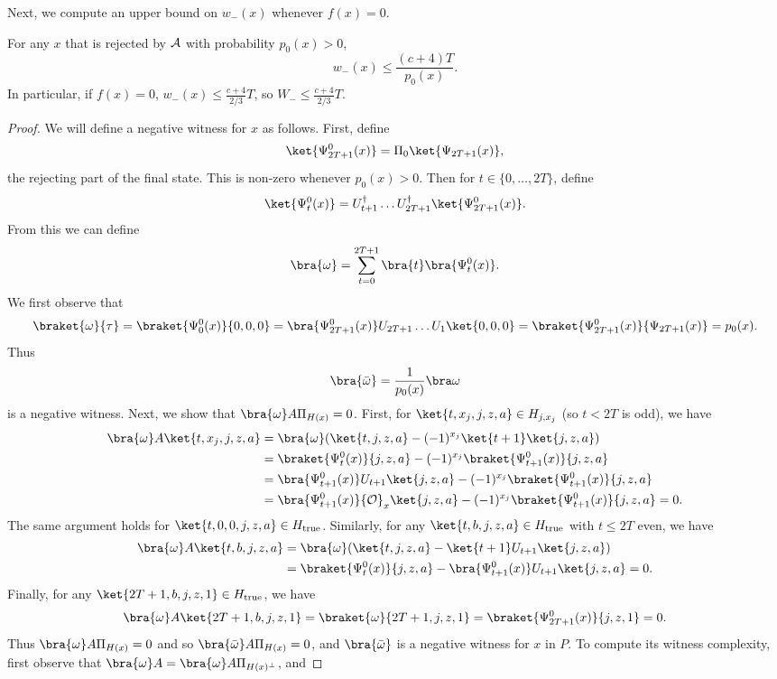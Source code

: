 \documentclass{toc}
\begin{document}
Next, we %
compute an upper bound on  %
$w_-(x)$ whenever $f(x)=0$. %
\begin{lemma}\label{lem:alg-to-span-neg}
For any $x$ that is rejected by $\cal A$ with probability $p_0(x)>0$, 
$$w_-(x)\leq \frac{(c+4)T}{p_0(x)}.$$
In particular, if $f(x)=0$, $w_-(x)\leq \frac{c+4}{2/3}T$, so $W_-\leq \frac{c+4}{2/3}T$.
\end{lemma}
\begin{proof}
We will define a negative witness for $x$ as follows. First, define 
$$\ket{\Psi_{2T+1}^0(x)}=\Pi_0\ket{\Psi_{2T+1}(x)},$$
the rejecting part of the final state. This is non-zero whenever $p_0(x)>0$. Then for $t\in\{0,\dots,2T\}$, define
$$\ket{\Psi_t^0(x)}=U_{t+1}^\dagger\dots U_{2T+1}^\dagger \ket{\Psi_{2T+1}^0(x)}.$$
From this we can define 
$$\bra{\omega} = \sum_{t=0}^{2T+1}\bra{t}\bra{\Psi_t^0(x)}.$$
We first observe that
$$\braket{\omega}{\tau} = \braket{\Psi_0^0(x)}{0,0,0}=\bra{\Psi_{2T+1}^0(x)}U_{2T+1}\dots U_1\ket{0,0,0}=\braket{\Psi_{2T+1}^0(x)}{\Psi_{2T+1}(x)} 
=p_0(x).$$
Thus 
$$\bra{\bar\omega}=\frac{1}{p_0(x)}\bra\omega$$
is a negative witness. Next, we show that $\bra{{\omega}} A\Pi_{H(x)}=0$. First, for $\ket{t,x_j,j,z,a}\in H_{j,x_j}$ (so $t<2T$ is odd), we have
\begin{align*}
\bra{\omega}A\ket{t,x_j,j,z,a} &= \bra{\omega}(\ket{t,j,z,a}-(-1)^{x_j}\ket{t+1}\ket{j,z,a})\\
&= \braket{\Psi_t^0(x)}{j,z,a} - (-1)^{x_j}\braket{\Psi_{t+1}^0(x)}{j,z,a}\\
&= \bra{\Psi_{t+1}^0(x)}U_{t+1}\ket{j,z,a} - (-1)^{x_j}\braket{\Psi_{t+1}^0(x)}{j,z,a}\\
&= \bra{\Psi_{t+1}^0(x)}{\cal O}_x\ket{j,z,a} - (-1)^{x_j}\braket{\Psi_{t+1}^0(x)}{j,z,a} =0.
\end{align*}
The same argument holds for $\ket{t,0,0,j,z,a}\in H_{\mathrm{true}}$.
Similarly, for any $\ket{t,b,j,z,a}\in H_{\mathrm{true}}$ with $t\leq 2T$ even, we have
\begin{align*}
\bra{\omega}A\ket{t,b,j,z,a} &= \bra{\omega}(\ket{t,j,z,a}-\ket{t+1}U_{t+1}\ket{j,z,a})\\
&= \braket{\Psi_t^0(x)}{j,z,a} - \bra{\Psi_{t+1}^0(x)}U_{t+1}\ket{j,z,a}=0.
\end{align*}
Finally, for any $\ket{2T+1,b,j,z,1}\in H_{\mathrm{true}}$, we have 
$$\bra{\omega}A\ket{2T+1,b,j,z,1} = \braket{\omega}{2T+1,j,z,1}=\braket{\Psi^0_{2T+1}(x)}{j,z,1}=0.$$
Thus $\bra{\omega}A\Pi_{H(x)}=0$ and so $\bra{\bar{\omega}}A\Pi_{H(x)}=0$, and $\bra{\bar\omega}$ is a negative witness for $x$ in $P$. To compute its witness complexity, first observe that $\bra{\omega} A = \bra{\omega} A\Pi_{H(x)^\bot}$, and 

\end{proof}
\end{document}
